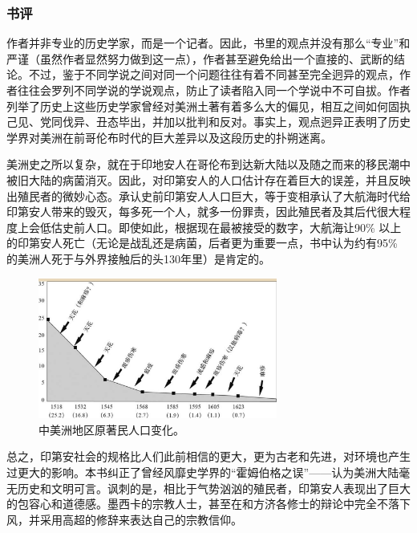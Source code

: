 \subsubsection{书评}

作者并非专业的历史学家，而是一个记者。因此，书里的观点并没有那么“专业”和严谨（虽然作者显然努力做到这一点），作者甚至避免给出一个直接的、武断的结论。不过，鉴于不同学说之间对同一个问题往往有着不同甚至完全迥异的观点，作者往往会罗列不同学说的学说观点，防止了读者陷入同一个学说中不可自拔。作者列举了历史上这些历史学家曾经对美洲土著有着多么大的偏见，相互之间如何固执己见、党同伐异、丑态毕出，并加以批判和反对。事实上，观点迥异正表明了历史学界对美洲在前哥伦布时代的巨大差异以及这段历史的扑朔迷离。

美洲史之所以复杂，就在于印地安人在哥伦布到达新大陆以及随之而来的移民潮中被旧大陆的病菌消灭。因此，对印第安人的人口估计存在着巨大的误差，并且反映出殖民者的微妙心态。承认史前印第安人人口巨大，等于变相承认了大航海时代给印第安人带来的毁灭，每多死一个人，就多一份罪责，因此殖民者及其后代很大程度上会低估史前人口。即使如此，根据现在最被接受的数字，大航海让90\% 以上的印第安人死亡（无论是战乱还是病菌，后者更为重要一点，书中认为约有95\% 的美洲人死于与外界接触后的头130年里）是肯定的。

\begin{figure}[htpb]
\centering
\includegraphics[width=0.7\textwidth]{images/zmzrk.jpg}
\caption{中美洲地区原著民人口变化。}
\end{figure}


总之，印第安社会的规格比人们此前相信的更大，更为古老和先进，对环境也产生过更大的影响。本书纠正了曾经风靡史学界的“霍姆伯格之误”——认为美洲大陆毫无历史和文明可言。讽刺的是，相比于气势汹汹的殖民者，印第安人表现出了巨大的包容心和道德感。墨西卡的宗教人士，甚至在和方济各修士的辩论中完全不落下风，并采用高超的修辞来表达自己的宗教信仰。

